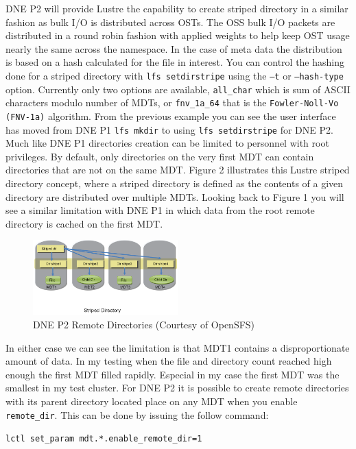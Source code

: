 \documentclass[conference,compsoc]{IEEEtran}
\def\code#1{\texttt{#1}}
\begin{document}
DNE P2 will provide Lustre the capability to create striped directory in a
similar fashion as bulk I/O is distributed across OSTs. The OSS bulk I/O
packets are distributed in a round robin fashion with applied weights to help
keep OST usage nearly the same across the namespace. In the case of meta data
the distribution is based on a hash calculated for the file in interest. You
can control the hashing done for a striped directory with \code{lfs setdirstripe}
using the \code{–t} or \code{--hash-type} option. Currently only two options are available,
\code{all\_char} which is sum of ASCII characters modulo number of MDTs, or \code{fnv\_1a\_64}
that is the \code{Fowler-Noll-Vo (FNV-1a)} algorithm. From the previous example you
can see the user interface has moved from DNE P1 \code{lfs mkdir} to using
\code{lfs setdirstripe}  for DNE P2. Much like DNE P1 directories creation can
be limited to personnel with root privileges. By default, only directories on
the very first MDT can contain directories that are not on the same MDT. Figure
2 illustrates this Lustre striped directory concept, where a striped directory
is defined as the contents of a given directory are distributed over multiple
MDTs.  Looking back to Figure 1 you will see a similar limitation with DNE P1
in which data from the root remote directory is cached on the first MDT.  

\begin{figure}[!ht]
  \centering
    \includegraphics[width=0.5\textwidth]{figs/dnep2}
  \caption{DNE P2 Remote Directories (Courtesy of OpenSFS)}
\end{figure}

In either case we can see the limitation is that MDT1 contains a
disproportionate amount of data. In my testing when the file and directory
count reached high enough the first MDT filled rapidly. Especial in my case the
first MDT was the smallest in my test cluster. For DNE P2 it is possible to
create remote directories with its parent directory located place on any MDT
when you enable \code{remote\_dir}. This can be done by issuing the follow command:

\code{lctl set\_param mdt.*.enable\_remote\_dir=1}
\end{document}

